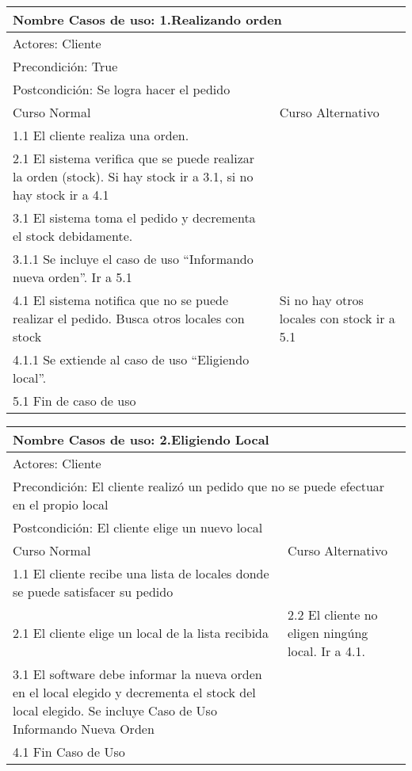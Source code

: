 \documentclass[a4paper,10pt]{article}
\begin{document}
\begin{center}
\begin{tabularx}{14cm}{|X|X|}
\hline
\multicolumn{2}{|l|}{Nombre Casos de uso: 1.Realizando orden}\\
\hline
\multicolumn{2}{|l|}{Actores: Cliente}\\
\hline
\multicolumn{2}{|l|}{Precondici\'on: True}\\
\hline
\multicolumn{2}{|l|}{Postcondici\'on: Se logra hacer el pedido}\\
\hline
Curso Normal & Curso Alternativo\\
\hline
1.1 El cliente realiza una orden. & 
\\
\hline
2.1 El sistema verifica que se puede realizar la orden (stock). Si hay stock ir a 3.1, si no hay stock ir a 4.1&
\\
\hline
3.1 El sistema toma el pedido y decrementa el stock debidamente. &
\\
\hline
3.1.1 Se incluye el caso de uso ``Informando nueva orden''. Ir a 5.1 &
\\
\hline
4.1 El sistema notifica que no se puede realizar el pedido. Busca otros locales con stock & Si no hay otros locales con stock ir a 5.1
\\
\hline
4.1.1 Se extiende al caso de uso ``Eligiendo local''. &
\\
\hline
5.1 Fin de caso de uso & \\
\hline
\end{tabularx}
\end{center}


\bigskip

\begin{center}
\begin{tabularx}{14cm}{|X|X|}
\hline
\multicolumn{2}{|l|}{Nombre Casos de uso: 2.Eligiendo Local}\\
\hline
\multicolumn{2}{|l|}{Actores: Cliente}\\
\hline
\multicolumn{2}{|l|}{Precondici\'on: El cliente realiz\'o un pedido que no se puede efectuar en el propio local}\\
\hline
\multicolumn{2}{|l|}{Postcondici\'on: El cliente elige un nuevo local}\\
\hline
Curso Normal & Curso Alternativo\\
\hline
1.1 El cliente recibe una lista de locales donde se puede satisfacer su pedido & 
\\
\hline
2.1 El cliente elige un local de la lista recibida & 2.2 El cliente no eligen ning\'ung local. Ir a 4.1.
\\
\hline
3.1 El software debe informar la nueva orden en el local elegido y decrementa el stock del local elegido. Se incluye Caso de Uso Informando Nueva Orden &
\\
\hline
4.1 Fin Caso de Uso &
\\
\hline
\end{tabularx}
\end{center}
\end{document}
